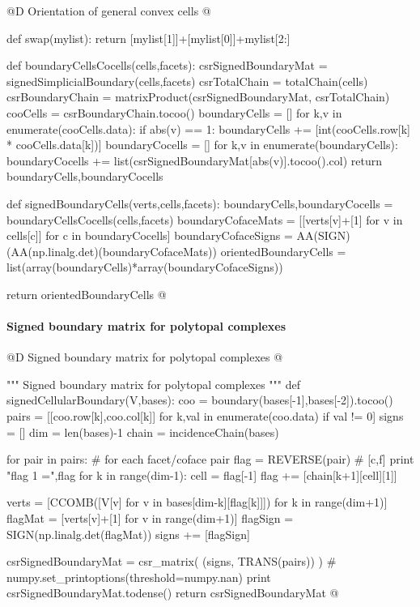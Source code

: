\documentclass[11pt,oneside]{article}	%
\begin{document}
@D Orientation of general convex cells
@{def swap(mylist): return [mylist[1]]+[mylist[0]]+mylist[2:]

def boundaryCellsCocells(cells,facets):
	csrSignedBoundaryMat = signedSimplicialBoundary(cells,facets)
	csrTotalChain = totalChain(cells)
	csrBoundaryChain = matrixProduct(csrSignedBoundaryMat, csrTotalChain)
	cooCells = csrBoundaryChain.tocoo()	
	boundaryCells = []
	for k,v in enumerate(cooCells.data):
		if abs(v) == 1:
			boundaryCells += [int(cooCells.row[k] * cooCells.data[k])]			
	boundaryCocells = []
	for k,v in enumerate(boundaryCells):
		boundaryCocells += list(csrSignedBoundaryMat[abs(v)].tocoo().col)		
	return boundaryCells,boundaryCocells

def signedBoundaryCells(verts,cells,facets):
	boundaryCells,boundaryCocells = boundaryCellsCocells(cells,facets)		
	boundaryCofaceMats = [[verts[v]+[1] for v in cells[c]] for c in boundaryCocells]
	boundaryCofaceSigns = AA(SIGN)(AA(np.linalg.det)(boundaryCofaceMats))
	orientedBoundaryCells = list(array(boundaryCells)*array(boundaryCofaceSigns))
	
	return orientedBoundaryCells
@}

\paragraph{Signed boundary matrix for polytopal complexes}

@D Signed boundary matrix for polytopal complexes
@{""" Signed boundary matrix for polytopal complexes """
def signedCellularBoundary(V,bases):
	coo = boundary(bases[-1],bases[-2]).tocoo()
	pairs = [[coo.row[k],coo.col[k]] for k,val in enumerate(coo.data) if val != 0]
	signs = []
	dim = len(bases)-1
	chain = incidenceChain(bases)
	
	for pair in pairs:		# for each facet/coface pair
		flag = REVERSE(pair) #  [c,f]
		print "flag 1 =",flag
		for k in range(dim-1):
			cell = flag[-1]
			flag += [chain[k+1][cell][1]]
		
		verts = [CCOMB([V[v] for v in bases[dim-k][flag[k]]]) for k in range(dim+1)]
		flagMat = [verts[v]+[1] for v in range(dim+1)]
		flagSign = SIGN(np.linalg.det(flagMat))
		signs += [flagSign]
	
	csrSignedBoundaryMat = csr_matrix( (signs, TRANS(pairs)) )
	# numpy.set_printoptions(threshold=numpy.nan)
	print csrSignedBoundaryMat.todense()
	return csrSignedBoundaryMat
@}
\end{document}
